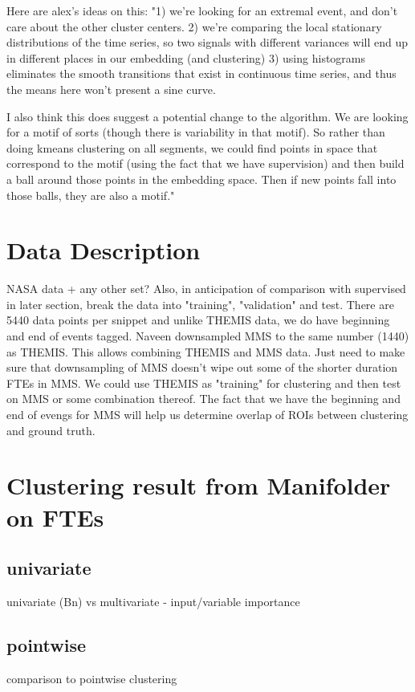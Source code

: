 \documentclass[aps,preprint,superscriptaddress]{revtex4}
\begin{document}
Here are alex's ideas on this:
"1) we're looking for an extremal event, and don't care about the other cluster centers.  
2) we're comparing the local stationary distributions of the time series, so two signals with different variances will end up in different places in our embedding (and clustering)
3) using histograms eliminates the smooth transitions that exist in continuous time series, and thus the means here won't present a sine curve.  

I also think this does suggest a potential change to the algorithm.   We are looking for a motif of sorts (though there is variability in that motif).  So rather than doing kmeans clustering on all segments, we could find points in space that correspond to the motif (using the fact that we have supervision) and then build a ball around those points in the embedding space.  Then if new points fall into those balls, they are also a motif."
\label{sec:ours}


\section{Data Description}
NASA data + any other set?  Also, in anticipation of comparison with supervised in later section, break the data into "training", "validation" and test.
There are 5440 data points per snippet and unlike THEMIS data, we do have beginning and end of events tagged. Naveen downsampled MMS to the same number (1440) as THEMIS. This allows combining THEMIS and MMS data. Just need to make sure that downsampling of MMS doesn’t wipe out some of the shorter duration FTEs in MMS. We could use THEMIS as "training" for clustering and then test on MMS or some combination thereof. The fact that we have the beginning and end of evengs for MMS will help us determine overlap of ROIs between clustering and ground truth.



\label{sec:data}

\section{Clustering result from Manifolder on FTEs}
\label{sec:manifolderFTE}
\subsection{univariate}
univariate (Bn) vs multivariate - input/variable importance
\subsection{pointwise}
comparison to pointwise clustering
\end{document}
